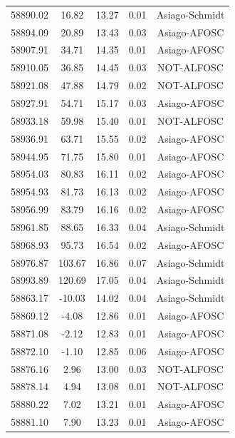 \begin{longtable}{|c|c|c|c|c|}
 58890.02 &   16.82 &       13.27 &          0.01 & Asiago-Schmidt \\
 58894.09 &   20.89 &       13.43 &          0.03 & Asiago-AFOSC  \\
 58907.91 &   34.71 &       14.35 &          0.01 & Asiago-AFOSC  \\
 58910.05 &   36.85 &       14.45 &          0.03 & NOT-ALFOSC   \\
 58921.08 &   47.88 &       14.79 &          0.02 & NOT-ALFOSC   \\
 58927.91 &   54.71 &       15.17 &          0.03 & Asiago-AFOSC  \\
 58933.18 &   59.98 &       15.40 &          0.01 & NOT-ALFOSC   \\
 58936.91 &   63.71 &       15.55 &          0.02 & Asiago-AFOSC  \\
 58944.95 &   71.75 &       15.80 &          0.01 & Asiago-AFOSC  \\
 58954.03 &   80.83 &       16.11 &          0.02 & Asiago-AFOSC  \\
 58954.93 &   81.73 &       16.13 &          0.02 & Asiago-AFOSC  \\
 58956.99 &   83.79 &       16.16 &          0.02 & Asiago-AFOSC  \\
 58961.85 &   88.65 &       16.33 &          0.04 & Asiago-Schmidt \\
 58968.93 &   95.73 &       16.54 &          0.02 & Asiago-AFOSC  \\
 58976.87 &  103.67 &       16.86 &          0.07 & Asiago-Schmidt \\
 58993.89 &  120.69 &       17.05 &          0.04 & Asiago-Schmidt \\
 58863.17 &  -10.03 &       14.02 &          0.04 & Asiago-Schmidt  \\
 58869.12 &   -4.08 &       12.86 &          0.01 & Asiago-AFOSC \\
 58871.08 &   -2.12 &       12.83 &          0.01 & Asiago-AFOSC \\
 58872.10 &   -1.10 &       12.85 &          0.06 & Asiago-AFOSC   \\
 58876.16 &    2.96 &       13.00 &          0.03 & NOT-ALFOSC  \\
 58878.14 &    4.94 &       13.08 &          0.01 & NOT-ALFOSC  \\
 58880.22 &    7.02 &       13.21 &          0.01 & Asiago-AFOSC \\
 58881.10 &    7.90 &       13.23 &          0.01 & Asiago-AFOSC \\

\end{longtable}
